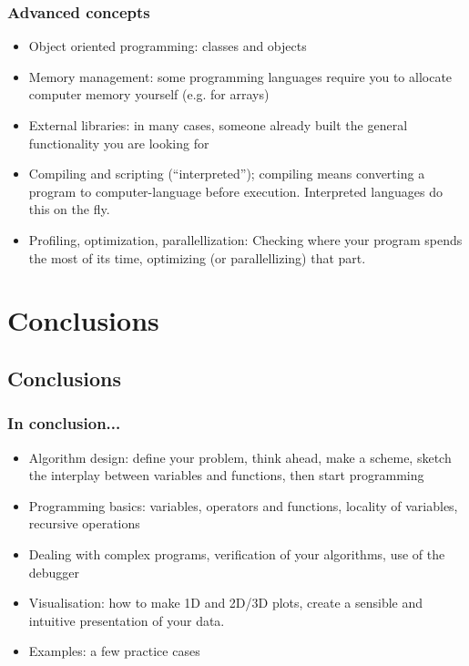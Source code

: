 \begin{frame}
 \frametitle{Advanced concepts}
 \begin{itemize}
   \item Object oriented programming: classes and objects
   \item Memory management: some programming languages require you to allocate computer memory yourself (e.g. for arrays)
   \item External libraries: in many cases, someone already built the general functionality you are looking for
   \item Compiling and scripting (``interpreted''); compiling means converting a program to computer-language before execution. Interpreted languages do this on the fly.
   \item Profiling, optimization, parallellization: Checking where your program spends the most of its time, optimizing (or parallellizing) that part.
 \end{itemize}\pause
\end{frame}


\section{Conclusions}
\subsection*{Conclusions}
\begin{frame}[fragile]
  \frametitle{In conclusion...}
  \begin{itemize}
     \item Algorithm design: define your problem, think ahead, make a scheme, sketch the interplay between variables and functions, then start programming
     \item Programming basics: variables, operators and functions, locality of variables, recursive operations
     \item Dealing with complex programs, verification of your algorithms, use of the debugger
     \item Visualisation: how to make 1D and 2D/3D plots, create a sensible and intuitive presentation of your data.
     \item Examples: a few practice cases
  \end{itemize}
\end{frame}

